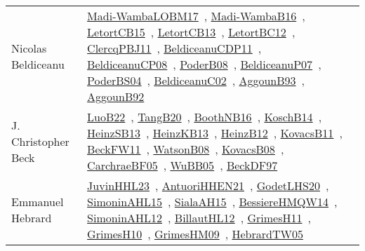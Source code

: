 {\begin{longtable}{p{4cm}p{20cm}}
Nicolas Beldiceanu & \href{papers/Madi-WambaLOBM17.pdf}{Madi-WambaLOBM17}~\cite{Madi-WambaLOBM17}, \href{papers/Madi-WambaB16.pdf}{Madi-WambaB16}~\cite{Madi-WambaB16}, \href{articles/LetortCB15.pdf}{LetortCB15}~\cite{LetortCB15}, \href{papers/LetortCB13.pdf}{LetortCB13}~\cite{LetortCB13}, \href{papers/LetortBC12.pdf}{LetortBC12}~\cite{LetortBC12}, \href{papers/ClercqPBJ11.pdf}{ClercqPBJ11}~\cite{ClercqPBJ11}, \href{articles/BeldiceanuCDP11.pdf}{BeldiceanuCDP11}~\cite{BeldiceanuCDP11}, \href{papers/BeldiceanuCP08.pdf}{BeldiceanuCP08}~\cite{BeldiceanuCP08}, \href{papers/PoderB08.pdf}{PoderB08}~\cite{PoderB08}, \href{papers/BeldiceanuP07.pdf}{BeldiceanuP07}~\cite{BeldiceanuP07}, \href{articles/PoderBS04.pdf}{PoderBS04}~\cite{PoderBS04}, \href{papers/BeldiceanuC02.pdf}{BeldiceanuC02}~\cite{BeldiceanuC02}, \href{articles/AggounB93.pdf}{AggounB93}~\cite{AggounB93}, \href{}{AggounB92}~\cite{AggounB92}\\
J. Christopher Beck & \href{papers/LuoB22.pdf}{LuoB22}~\cite{LuoB22}, \href{papers/TangB20.pdf}{TangB20}~\cite{TangB20}, \href{papers/BoothNB16.pdf}{BoothNB16}~\cite{BoothNB16}, \href{papers/KoschB14.pdf}{KoschB14}~\cite{KoschB14}, \href{articles/HeinzSB13.pdf}{HeinzSB13}~\cite{HeinzSB13}, \href{papers/HeinzKB13.pdf}{HeinzKB13}~\cite{HeinzKB13}, \href{papers/HeinzB12.pdf}{HeinzB12}~\cite{HeinzB12}, \href{articles/KovacsB11.pdf}{KovacsB11}~\cite{KovacsB11}, \href{}{BeckFW11}~\cite{BeckFW11}, \href{papers/WatsonB08.pdf}{WatsonB08}~\cite{WatsonB08}, \href{articles/KovacsB08.pdf}{KovacsB08}~\cite{KovacsB08}, \href{papers/CarchraeBF05.pdf}{CarchraeBF05}~\cite{CarchraeBF05}, \href{papers/WuBB05.pdf}{WuBB05}~\cite{WuBB05}, \href{papers/BeckDF97.pdf}{BeckDF97}~\cite{BeckDF97}\\
Emmanuel Hebrard & \href{papers/JuvinHHL23.pdf}{JuvinHHL23}~\cite{JuvinHHL23}, \href{papers/AntuoriHHEN21.pdf}{AntuoriHHEN21}~\cite{AntuoriHHEN21}, \href{papers/GodetLHS20.pdf}{GodetLHS20}~\cite{GodetLHS20}, \href{articles/SimoninAHL15.pdf}{SimoninAHL15}~\cite{SimoninAHL15}, \href{papers/SialaAH15.pdf}{SialaAH15}~\cite{SialaAH15}, \href{papers/BessiereHMQW14.pdf}{BessiereHMQW14}~\cite{BessiereHMQW14}, \href{papers/SimoninAHL12.pdf}{SimoninAHL12}~\cite{SimoninAHL12}, \href{papers/BillautHL12.pdf}{BillautHL12}~\cite{BillautHL12}, \href{papers/GrimesH11.pdf}{GrimesH11}~\cite{GrimesH11}, \href{papers/GrimesH10.pdf}{GrimesH10}~\cite{GrimesH10}, \href{papers/GrimesHM09.pdf}{GrimesHM09}~\cite{GrimesHM09}, \href{papers/HebrardTW05.pdf}{HebrardTW05}~\cite{HebrardTW05}\\

\end{longtable}}
